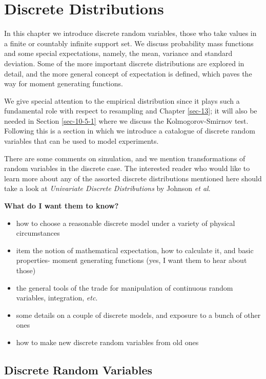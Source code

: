 \documentclass[captions=tableheading]{scrbook}
\begin{document}
\chapter{Discrete Distributions}
\label{sec-5}
\label{cha-Discrete-Distributions}


\noindent 
In this chapter we introduce discrete random variables, those who take values in a finite or countably infinite support set. We discuss probability mass functions and some special expectations, namely, the mean, variance and standard deviation. Some of the more important discrete distributions are explored in detail, and the more general concept of expectation is defined, which paves the way for moment generating functions. 

We give special attention to the empirical distribution since it plays such a fundamental role with respect to resampling and Chapter \ref{sec-13}; it will also be needed in Section \ref{sec-10-5-1} where we discuss the Kolmogorov-Smirnov test. Following this is a section in which we introduce a catalogue of discrete random variables that can be used to model experiments.

There are some comments on simulation, and we mention transformations of random variables in the discrete case. The interested reader who would like to learn more about any of the assorted discrete distributions mentioned here should take a look at \emph{Univariate Discrete Distributions} by Johnson \emph{et al}\cite{Johnson1993}.

\textbf{What do I want them to know?}
\begin{itemize}
\item how to choose a reasonable discrete model under a variety of physical circumstances
\item item the notion of mathematical expectation, how to calculate it, and basic properties- moment generating functions (yes, I want them to hear about those)
\item the general tools of the trade for manipulation of continuous random variables, integration, \emph{etc}.
\item some details on a couple of discrete models, and exposure to a bunch of other ones
\item how to make new discrete random variables from old ones
\end{itemize}
\section{Discrete Random Variables}
\label{sec-5-1}
\label{sec-discrete-random-variables}
\end{document}
